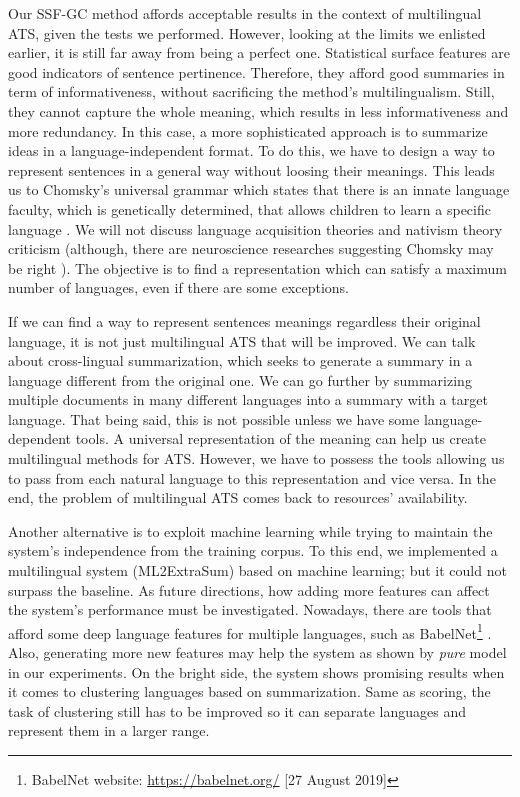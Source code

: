 \documentclass[12pt, oneside, a4paper]{article}
\begin{document}
Our SSF-GC method affords acceptable results in the context of multilingual ATS, given the tests we performed.
However, looking at the limits we enlisted earlier, it is still far away from being a perfect one. 
Statistical surface features are good indicators of sentence pertinence.
Therefore, they afford good summaries in term of informativeness, without sacrificing the method's multilingualism.
Still, they cannot capture the whole meaning, which results in less informativeness and more redundancy. 
In this case, a more sophisticated approach is to summarize ideas in a language-independent format. 
To do this, we have to design a way to represent sentences in a general way without loosing their meanings.
This leads us to Chomsky's universal grammar which states that there is an innate language faculty, which is genetically determined, that allows children to learn a specific language \citep{80-chomsky}.
We will not discuss language acquisition theories and nativism theory criticism (although, there are neuroscience researches suggesting Chomsky may be right \citep{16-ding-al}). 
The objective is to find a representation which can satisfy a maximum number of languages, even if there are some exceptions.


If we can find a way to represent sentences meanings regardless their original language, it is not just multilingual ATS that will be improved. 
We can talk about cross-lingual summarization, which seeks to generate a summary in a language different from the original one. 
We can go further by summarizing multiple documents in many different languages into a summary with a target language.
That being said, this is not possible unless we have some language-dependent tools. 
A universal representation of the meaning can help us create multilingual methods for ATS. 
However, we have to possess the tools allowing us to pass from each natural language to this representation and vice versa. 
In the end, the problem of multilingual ATS comes back to resources' availability.


Another alternative is to exploit machine learning while trying to maintain the system's independence from the training corpus. 
To this end, we implemented a multilingual system (ML2ExtraSum) based on machine learning; but it could not surpass the baseline.
As future directions, how adding more features can affect the system's performance must be investigated.
Nowadays, there are tools that afford some deep language features for multiple languages, such as BabelNet\footnote{BabelNet website: \url{https://babelnet.org/} [27 August 2019]} \citep{12-naigli-ponzetto}.
Also, generating more new features may help the system as shown by \textit{pure} model in our experiments. 
On the bright side, the system shows promising results when it comes to clustering languages based on summarization.
Same as scoring, the task of clustering  still has to be improved so it can separate languages and represent them in a larger range.




{\footnotesize }
\end{document}
